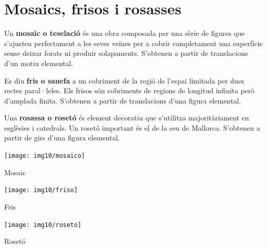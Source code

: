 \pagebreak
\section{Mosaics, frisos i rosasses}

\begin{theorybox}
	
	Un \textbf{mosaic o teselació} és una obra composada per una sèrie de figures que s'ajusten perfectament a les seves veïnes per a cobrir completament una superfície sense deixar forats ni produir solapaments. S'obtenen a partir de translacions d'un motiu elemental.
	
	
	Es diu \textbf{fris o sanefa} a un cobriment de la regió de l'espai limitada per dues rectes paral·leles. Els frisos són cobriments de regions de longitud infinita però d'amplada finita.  S'obtenen a partir de translacions d'una figura elemental.
	
	Una \textbf{rosassa o rosetó} és element decoratiu que s'utilitza majoritàriament en esglèsies i catedrals. Un rosetó important és el de la seu de Mallorca. S'obtenen a partir de girs d'una figura elemental.
	
	\begin{multicols}{3}
		\centering
		\footnotesize
		\texttt{[image: img10/mosaico]}
		
		Mosaic
		
		\texttt{[image: img10/friso]}
		
		Fris
		
		\texttt{[image: img10/roseto]}
		
		Rosetó
	\end{multicols}
	
	
\end{theorybox}

 


